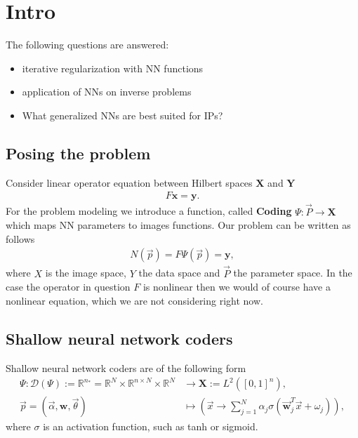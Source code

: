 




\maketitle

\tableofcontents

\section{Intro}
The following questions are answered:
\begin{itemize}
    \item iterative regularization with NN functions
    \item application of NNs on inverse problems
    \item What generalized NNs are best suited for IPs?
\end{itemize}

\subsection{Posing the problem}
Consider linear operator equation between Hilbert spaces $\mathbf{X}$ and
$\mathbf{Y}$
\begin{align}
    F\mathbf{x} = \mathbf{y}.
\end{align}
For the problem modeling we introduce a function, called \textbf{Coding}
$\Psi: \vec{P} \to \mathbf{X}$ which maps NN parameters to images functions.
Our problem can be written as follows
\begin{align}
    N(\vec{p}) = F\Psi(\vec{p}) = \mathbf{y},
\end{align}
where $X$ is the image space, $Y$ the data space and $\vec{P}$ the parameter
space. In the case the operator in question $F$ is nonlinear then we would of
course have a nonlinear equation, which we are not considering right now.

\subsection{Shallow neural network coders}
Shallow neural network coders are of the following form
\begin{align}
    \Psi:
    \mathcal{D}(\Psi) := \mathbb{R}^{n_*} =
    \mathbb{R}^{N}\times \mathbb{R}^{n \times N}
    \times \mathbb{R}^{N}
    &\to \mathbf{X} :=
    L^{2}\left([0, 1]^{n}\right),\\
    \vec{p} = (\vec{\alpha}, \mathbf{w}, \vec{\theta}) &\mapsto
    \left(\vec{x} \to \sum_{j=1}^{N} \alpha_j\sigma\left(
    \vec{\mathbf{w}}_j^{T}\vec{x} + \omega_j \right)  \right),
\end{align}
where $\sigma$ is an activation function, such as tanh or sigmoid.

